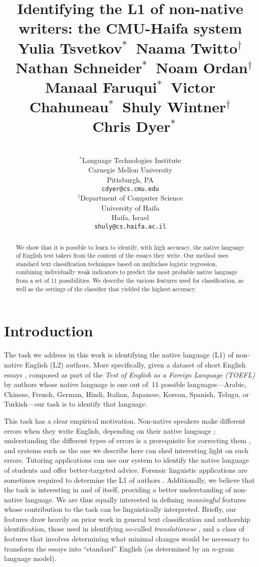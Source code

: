 \documentclass[11pt,letterpaper]{article}
\title{Identifying the L1 of non-native writers: the CMU-Haifa system\\[1em] 
{\large Yulia Tsvetkov$^\ast$\ Naama Twitto$^\dagger$\  Nathan Schneider$^\ast$\ Noam Ordan$^\dagger$\\ 
Manaal Faruqui$^\ast$\  Victor Chahuneau$^\ast$\  Shuly Wintner$^\dagger$ \  Chris Dyer$^\ast$}\\[-3em]
}
\author{
\\
$^\ast$Language Technologies Institute\\Carnegie Mellon University\\Pittsburgh, PA\\\texttt{cdyer@cs.cmu.edu}
\And
\\
$^\dagger$Department of Computer Science\\University of Haifa\\Haifa, Israel\\\texttt{shuly@cs.haifa.ac.il}
%
%
%
%
}
\date{}
\newcommand{\citep}[1]{\cite{#1}}
\newcommand{\ensuretext}[1]{#1}
\newcommand{\nssmarker}{\ensuretext{\textcolor{magenta}{\ensuremath{^{\textsc{NS}}_{\textsc{S}}}}}}
\newcommand{\arkcomment}[3]{}
\newcommand{\nss}[1]{\arkcomment{\nssmarker}{#1}{magenta}}
\begin{document}
\maketitle
\begin{abstract}
We show that it is possible to learn to identify, with high accuracy, the native language of English test takers from the content of the essays they write.  Our method uses standard text classification
techniques based on multiclass logistic regression, combining individually weak indicators to predict the most probable native language from a set of 11 possibilities. We describe the various features
used for classification, as well as the settings of the classifier
that yielded the highest accuracy.
\end{abstract}

\nss{comment on how we did in relation to other task participants? as a reader I'd want to know!}

\section{Introduction}
\label{sec:intro}
The task we address in this work is identifying the native language
(L1) of non-native English (L2) authors. More specifically, given a
dataset of short English essays
\citep{blanchard-tetreault-higgins-cahill-chodorow:2013:TOEFL11-RR},
composed as part of the \emph{Test of English as a Foreign Language
  (TOEFL)} by authors whose native language is one out of~11 possible
languages---Arabic, Chinese, French, German, Hindi, Italian, Japanese,
Korean, Spanish, Telugu, or Turkish---our task is to identify that
language.

This task has a clear empirical motivation. Non-native speakers make
different errors when they write English, depending on their native
language \citep{lado-57,swan2001learner}; understanding the different types of
errors is a prerequisite for correcting them
\citep{Leacock:2010:AGE:1855062}, and systems such as the one we
describe here can shed interesting light on such errors. Tutoring
applications can use our system to identify the native language of
students and offer better-targeted advice. Forensic linguistic
applications are sometimes required to determine the L1 of authors
\citep{estival-gaustad-pham-radford-hutchinson:2007:ALTA2007,estival2007author}. Additionally,
we believe that the task is interesting in and of itself, providing a
better understanding of non-native language. We are thus equally
interested in defining \emph{meaningful} features whose contribution
to the task can be linguistically interpreted. Briefly, our features draw heavily on prior work in general text classification and authorship identification, those used in identifying so-called \emph{translationese} \cite{vered:noam:shuly}, and a class of features that involves  determining what minimal changes would be necessary to transform the essays into ``standard'' English (as determined by an $n$-gram language model).
\end{document}
